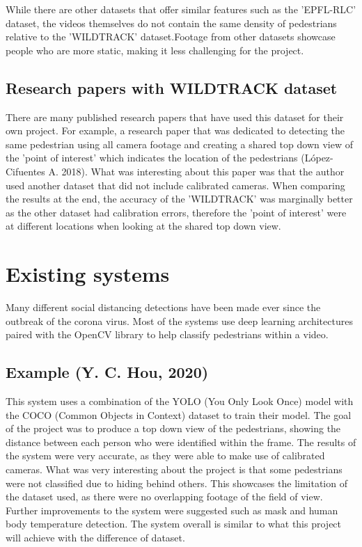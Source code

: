 \documentclass[12pt]{report}
\begin{document}
While there are other datasets that offer similar features such as the 'EPFL-RLC' dataset, the videos themselves do not contain the same density of pedestrians relative to the 'WILDTRACK' dataset.Footage from other datasets showcase people who are more static, making it less challenging for the project.

\subsection{Research papers with WILDTRACK dataset}

There are many published research papers that have used this dataset for their own project. For example, a research paper that was dedicated to detecting the same pedestrian using all camera footage and creating a shared top down view of the 'point of interest' which indicates the location of the pedestrians (López-Cifuentes A. 2018). What was interesting about this paper was that the author used another dataset that did not include calibrated cameras. When comparing the results at the end, the accuracy of the 'WILDTRACK' was marginally better as the other dataset had calibration errors, therefore the 'point of interest' were at different locations when looking at the shared top down view.


\section{Existing systems}

Many different social distancing detections have been made ever since the outbreak of the corona virus. Most of the systems use deep learning architectures paired with the OpenCV library to help classify pedestrians within a video.

\subsection{Example (Y. C. Hou, 2020)}

This system uses a combination of the YOLO (You Only Look Once) model with the COCO (Common Objects in Context) dataset to train their model. The goal of the project was to produce a top down view of the pedestrians, showing the distance between each person who were identified within the frame. The results of the system were very accurate, as they were able to make use of calibrated cameras. What was very interesting about the project is that some pedestrians were not classified due to hiding behind others. This showcases the limitation of the dataset used, as there were no overlapping footage of the field of view. Further improvements to the system were suggested such as mask and human body temperature detection. The system overall is similar to what this project will achieve with the difference of dataset.
\end{document}
